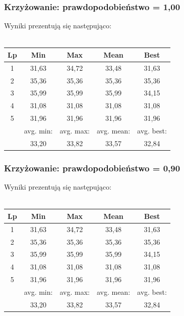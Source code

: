 \documentclass[a4paper,11pt]{article}
\begin{document}
				\subsubsection{Krzyżowanie: prawdopodobieństwo = 1,00}
					Wyniki prezentują się następująco:\\~\\
					\begin{tabular}{|c|c|c|c|c|}
						\hline 
						Lp & Min & Max & Mean & Best \\
						\hline
						1 & 31,63  & 34,72 & 33,48 & 31,63\\\hline
						2 & 35,36 & 35,36  &35,36 & 35,36 \\\hline
						3 & 35,99 & 35,99  & 35,99 &34,15 \\\hline
						4 & 31,08 & 31,08  & 31,08& 31,08 \\\hline
						5 & 31,96 & 31,96  & 31,96 & 31,96\\\hline
						&avg. min:&avg. max:&avg. mean:&avg. best:\\\hline
						& 33,20 & 33,82& 33,57 &32,84\\\hline
					\end{tabular} 
				\subsubsection{Krzyżowanie: prawdopodobieństwo = 0,90}
					Wyniki prezentują się następująco:\\~\\
					\begin{tabular}{|c|c|c|c|c|}
						\hline 
						Lp & Min & Max & Mean & Best \\
						\hline
						1 & 31,63  & 34,72 & 33,48 & 31,63\\\hline
						2 & 35,36 & 35,36  &35,36 & 35,36 \\\hline
						3 & 35,99 & 35,99  & 35,99 &34,15 \\\hline
						4 & 31,08 & 31,08  & 31,08& 31,08 \\\hline
						5 & 31,96 & 31,96  & 31,96 & 31,96\\\hline
						&avg. min:&avg. max:&avg. mean:&avg. best:\\\hline
						& 33,20 & 33,82& 33,57 &32,84\\\hline
					\end{tabular} 
\end{document}

